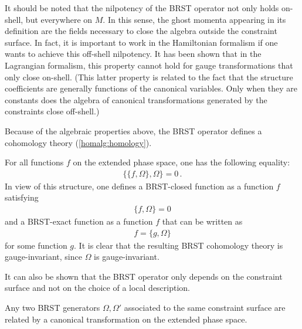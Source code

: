     \begin{remark}
        It should be noted that the nilpotency of the BRST operator not only holds on-shell, but everywhere on $M$. In this sense, the ghost momenta appearing in its definition are the fields necessary to close the algebra outside the constraint surface. In fact, it is important to work in the Hamiltonian formalism if one wants to achieve this off-shell nilpotency. It has been shown that in the Lagrangian formalism, this property cannot hold for gauge transformations that only close on-shell. (This latter property is related to the fact that the structure coefficients are generally functions of the canonical variables. Only when they are constants does the algebra of canonical transformations generated by the constraints close off-shell.)
    \end{remark}

    Because of the algebraic properties above, the BRST operator defines a cohomology theory (\cref{homalg:homology}).
    \begin{property}
        For all functions $f$ on the extended phase space, one has the following equality:
        \begin{gather}
            \{\{f,\Omega\},\Omega\} = 0\,.
        \end{gather}
        In view of this structure, one defines a BRST-closed function as a function $f$ satisfying
        \begin{gather}
            \{f,\Omega\} = 0
        \end{gather}
        and a BRST-exact function as a function $f$ that can be written as
        \begin{gather}
            f = \{g,\Omega\}
        \end{gather}
        for some function $g$. It is clear that the resulting BRST cohomology theory is gauge-invariant, since $\Omega$ is gauge-invariant.
    \end{property}
    It can also be shown that the BRST operator only depends on the constraint surface and not on the choice of a local description.
    \begin{property}[Uniqueness]
        Any two BRST generators $\Omega,\Omega'$ associated to the same constraint surface are related by a canonical transformation on the extended phase space.
    \end{property}

